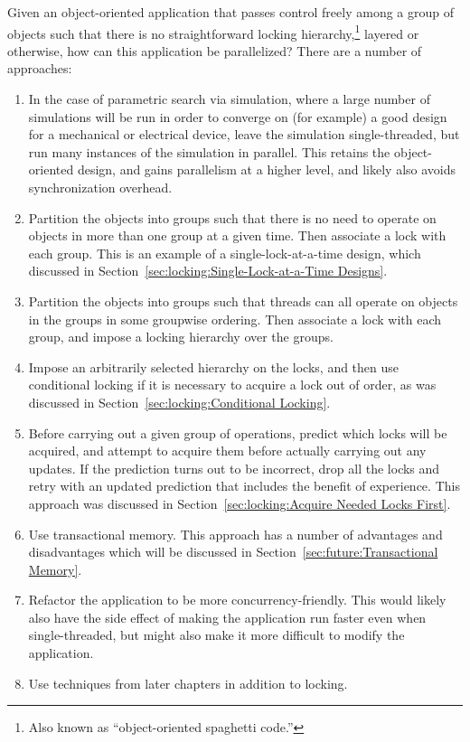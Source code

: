 \QuickQ{}
	Given an object-oriented application that passes control freely
	among a group of objects such that there is no straightforward
	locking hierarchy,\footnote{
		Also known as ``object-oriented spaghetti code.''}
	layered or otherwise, how can this
	application be parallelized?
\QuickA{}
	There are a number of approaches:
	\begin{enumerate}
	\item	In the case of parametric search via simulation,
		where a large number of simulations will be run
		in order to converge on (for example) a good design
		for a mechanical or electrical device, leave the
		simulation single-threaded, but run many instances
		of the simulation in parallel.
		This retains the object-oriented design, and
		gains parallelism at a higher level, and likely
		also avoids synchronization overhead.
	\item	Partition the objects into groups such that there
		is no need to operate on objects in
		more than one group at a given time.
		Then associate a lock with each group.
		This is an example of a single-lock-at-a-time
		design, which discussed in
		Section~\ref{sec:locking:Single-Lock-at-a-Time Designs}.
	\item	Partition the objects into groups such that threads
		can all operate on objects in the groups in some
		groupwise ordering.
		Then associate a lock with each group, and impose a
		locking hierarchy over the groups.
	\item	Impose an arbitrarily selected hierarchy on the locks,
		and then use conditional locking if it is necessary
		to acquire a lock out of order, as was discussed in
		Section~\ref{sec:locking:Conditional Locking}.
	\item	Before carrying out a given group of operations, predict
		which locks will be acquired, and attempt to acquire them
		before actually carrying out any updates.
		If the prediction turns out to be incorrect, drop
		all the locks and retry with an updated prediction
		that includes the benefit of experience.
		This approach was discussed in
		Section~\ref{sec:locking:Acquire Needed Locks First}.
	\item	Use transactional memory.
		This approach has a number of advantages and disadvantages
		which will be discussed in
		Section~\ref{sec:future:Transactional Memory}.
	\item	Refactor the application to be more concurrency-friendly.
		This would likely also have the side effect of making
		the application run faster even when single-threaded, but might
		also make it more difficult to modify the application.
	\item	Use techniques from later chapters in addition to locking.
	\end{enumerate}

